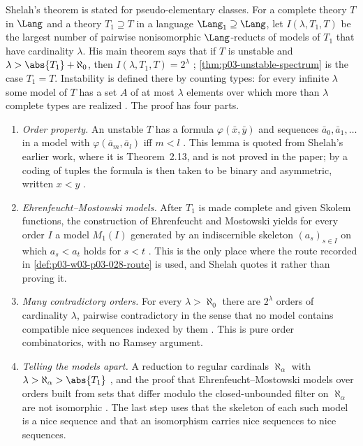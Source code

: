 Shelah's theorem is stated for pseudo-elementary classes.  For a complete
theory \(T\) in \(\Lang\) and a theory \(T_1\supseteq T\) in a language
\(\Lang_1\supseteq\Lang\), let \(I(\lambda,T_1,T)\) be the largest number
of pairwise nonisomorphic \(\Lang\)-reducts of models of \(T_1\) that have
cardinality \(\lambda\).  His main theorem says that if \(T\) is unstable
and \(\lambda>\abs{T_1}+\aleph_0\), then \(I(\lambda,T_1,T)=2^\lambda\)
\cite[Theorem~0.1, pp.~473--474]{Shelah1971NonIsomorphicModels};
\cref{thm:p03-unstable-spectrum} is the case \(T_1=T\).  Instability is
defined there by counting types: for every infinite \(\lambda\) some model
of \(T\) has a set \(A\) of at most \(\lambda\) elements over which more than
\(\lambda\) complete types are realized
\cite[p.~474]{Shelah1971NonIsomorphicModels}.  The proof has four parts.
\begin{enumerate}
\item \emph{Order property.}  An unstable \(T\) has a formula
\(\varphi(\bar x,\bar y)\) and sequences \(\bar a_0,\bar a_1,\ldots\) in a
model with \(\varphi(\bar a_m,\bar a_l)\) iff \(m<l\)
\cite[Lemma~1.1, p.~475]{Shelah1971NonIsomorphicModels}.  This lemma is
quoted from Shelah's earlier work, where it is Theorem~2.13, and is not
proved in the paper; by a coding of tuples the formula is then taken to be
binary and asymmetric, written \(x<y\)
\cite[Assumption~2, p.~475]{Shelah1971NonIsomorphicModels}.
\item \emph{Ehrenfeucht--Mostowski models.}  After \(T_1\) is made complete
and given Skolem functions, the construction of Ehrenfeucht and Mostowski
yields for every order \(I\) a model \(M_1(I)\) generated by an
indiscernible skeleton \((a_s)_{s\in I}\) on which \(a_s<a_t\) holds for
\(s<t\) \cite[Lemma~1.2 and Definition~1.1, p.~476]{Shelah1971NonIsomorphicModels}.
This is the only place where the route recorded in
\cref{def:p03-w03-p03-028-route} is used, and Shelah quotes it rather than
proving it.
\item \emph{Many contradictory orders.}  For every
\(\lambda>\aleph_0\) there are \(2^\lambda\) orders of cardinality
\(\lambda\), pairwise contradictory in the sense that no model contains
compatible nice sequences indexed by them
\cite[Definitions~2.1--2.2 and Theorem~2.2, pp.~477--481]{Shelah1971NonIsomorphicModels}.
This is pure order combinatorics, with no Ramsey argument.
\item \emph{Telling the models apart.}  A reduction to regular cardinals
\(\aleph_\alpha\) with \(\lambda>\aleph_\alpha>\abs{T_1}\)
\cite[Theorem~3.1 and Lemma~3.2, pp.~481--482]{Shelah1971NonIsomorphicModels},
and the proof that Ehrenfeucht--Mostowski models over orders built from
sets that differ modulo the closed-unbounded filter on \(\aleph_\alpha\) are
not isomorphic
\cite[Theorem~4.1 and Lemma~4.2, pp.~484--486]{Shelah1971NonIsomorphicModels}.
The last step uses that the skeleton of each such model is a nice sequence
and that an isomorphism carries nice sequences to nice sequences.
\end{enumerate}

